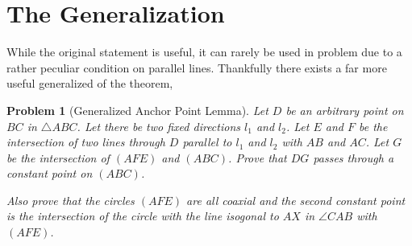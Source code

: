 \documentclass{article}
\newtheorem{problem}{Problem}
\begin{document}
\section{The Generalization}

While the original statement is useful, it can rarely be used in problem due to a rather peculiar condition on parallel lines. Thankfully there exists a far more useful generalized of the theorem,

\begin{problem}[Generalized Anchor Point Lemma]
  Let \(D\) be an arbitrary point on \(BC\) in \(\triangle{ABC}\). Let there be two fixed directions \(l_1\) and \(l_2\). Let \(E\) and \(F\) be the intersection of two lines through \(D\) parallel to \(l_1\) and \(l_2\) with \(AB\) and \(AC\). Let \(G\) be the intersection of \((AFE)\) and \((ABC)\). Prove that \(DG\) passes through a constant point on \((ABC)\).

  Also prove that the circles \((AFE)\) are all coaxial and the second constant point is the intersection of the circle with the line isogonal to \(AX\) in \(\angle{CAB}\) with \((AFE)\).
\end{problem}
\end{document}
